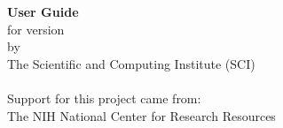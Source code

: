 %
% 
% 
% 
% 
% 
%

%

\thispagestyle{empty}
\begin{center}
  \vspace*{1.25in}
  {\huge\bf \sr{} User Guide}\\
  {for \sr{} version \version{}} \\
  \vspace{1.25in}
  {\Large
    by \\
    The Scientific and Computing Institute (SCI)\\
    \\
    \vfill
    Support for this project came from:\\
    \smallskip
    The NIH National Center for Research Resources
    \vspace{0.5in}
  }
\end{center}

